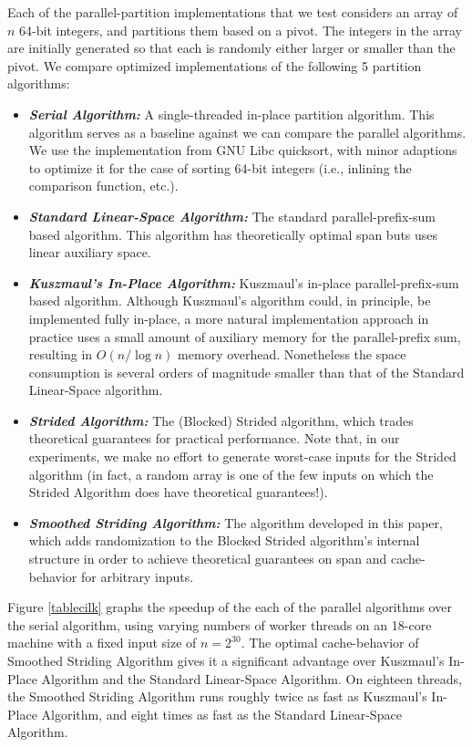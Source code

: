 \documentclass[11pt]{article}
\newcommand{\defn}[1]{{\textit{\textbf{\boldmath #1}}} }
\renewcommand{\paragraph}[1]{\vspace{0.09in}\noindent{\bf \boldmath #1.}}
\theoremstyle{remark}
\theoremstyle{remark}
\begin{document}
Each of the parallel-partition implementations that we test considers
an array of $n$ 64-bit integers, and partitions them based on a
pivot. The integers in the array are initially generated so that each
is randomly either larger or smaller than the pivot. We compare
optimized implementations of the following 5 partition algorithms:
\begin{itemize}
\item \defn{Serial Algorithm:} A single-threaded in-place partition
  algorithm. This algorithm serves as a baseline against we can
  compare the parallel algorithms. We use the implementation from GNU
  Libc quicksort, with minor adaptions to optimize it for the case of
  sorting 64-bit integers (i.e., inlining the comparison function,
  etc.).
\item \defn{Standard Linear-Space Algorithm:} The standard
  parallel-prefix-sum based algorithm. This algorithm has
  theoretically optimal span buts uses linear auxiliary space.
\item \defn{Kuszmaul's In-Place Algorithm:} Kuszmaul's in-place
  parallel-prefix-sum based algorithm. Although Kuszmaul's algorithm
  could, in principle, be implemented fully in-place, a more natural
  implementation approach in practice uses a small amount of auxiliary
  memory for the parallel-prefix sum, resulting in $O(n / \log n)$
  memory overhead. Nonetheless the space consumption is several orders
  of magnitude smaller than that of the Standard Linear-Space
  algorithm.
\item \defn{Strided Algorithm:} The (Blocked) Strided algorithm, which
  trades theoretical guarantees for practical performance. Note that,
  in our experiments, we make no effort to generate worst-case inputs
  for the Strided algorithm (in fact, a random array is one of the few
  inputs on which the Strided Algorithm does have theoretical
  guarantees!).
\item \defn{Smoothed Striding Algorithm:} The algorithm developed in
  this paper, which adds randomization to the Blocked Strided
  algorithm's internal structure in order to achieve theoretical
  guarantees on span and cache-behavior for arbitrary inputs.
\end{itemize}

\paragraph{Comparing running times in parallel and serial}
Figure \ref{tablecilk} graphs the speedup of the each of the parallel
algorithms over the serial algorithm, using varying numbers of worker
threads on an 18-core machine with a fixed input size of $n =
2^{30}$. The optimal cache-behavior of Smoothed Striding Algorithm
gives it a significant advantage over Kuszmaul's In-Place Algorithm
and the Standard Linear-Space Algorithm. On eighteen threads, the
Smoothed Striding Algorithm runs roughly twice as fast as Kuszmaul's
In-Place Algorithm, and eight times as fast as the Standard
Linear-Space Algorithm.
\end{document}

